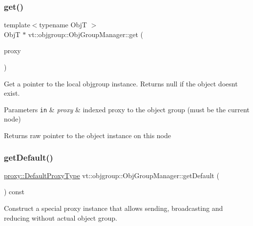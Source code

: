 \subsubsection{\texorpdfstring{get()}{get()}\hspace{0.1cm}{\footnotesize\ttfamily [2/2]}}
{\footnotesize\ttfamily template$<$typename ObjT $>$ \\
ObjT $\ast$ vt\+::objgroup\+::\+Obj\+Group\+Manager\+::get (\begin{DoxyParamCaption}\item[{\hyperlink{structvt_1_1objgroup_1_1_obj_group_manager_adba6c8ecb0f4c30e719f1abb995cfc9b}{Proxy\+Elm\+Type}$<$ ObjT $>$}]{proxy }\end{DoxyParamCaption})}



Get a pointer to the local objgroup instance. Returns null if the object doesn\textquotesingle{}t exist. 


\begin{DoxyParams}[1]{Parameters}
\mbox{\tt in}  & {\em proxy} & indexed proxy to the object group (must be the current node)\\
\hline
\end{DoxyParams}
\begin{DoxyReturn}{Returns}
raw pointer to the object instance on this node 
\end{DoxyReturn}
\mbox{\label{structvt_1_1objgroup_1_1_obj_group_manager_a4447b8f4881710bc7b0b7a37de9d10b9}} 
\subsubsection{\texorpdfstring{get\+Default()}{getDefault()}}
{\footnotesize\ttfamily \hyperlink{namespacevt_1_1objgroup_1_1proxy_ac7e0a0acb3b31d5469a603de08192adc}{proxy\+::\+Default\+Proxy\+Type} vt\+::objgroup\+::\+Obj\+Group\+Manager\+::get\+Default (\begin{DoxyParamCaption}{ }\end{DoxyParamCaption}) const}



Construct a special proxy instance that allows sending, broadcasting and reducing without actual object group. 

